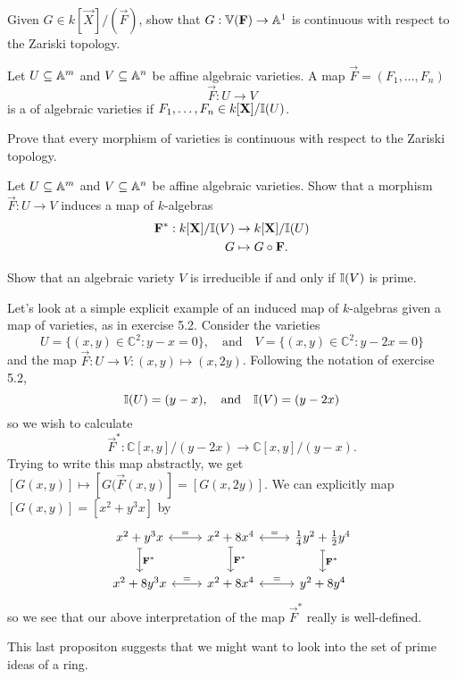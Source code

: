 \documentclass{ximera}
\begin{document}
\begin{exercise}
  Given $G\in k[\vec{X}]/(\vec{F})$, show that $G: \mathbb V(\mathbf{F})\to
  \mathbb A^1$ is continuous with respect to the Zariski topology.
\end{exercise}



\begin{definition}
  Let $U\subseteq\mathbb A^m$ and $V\subseteq\mathbb A^n$ be affine algebraic
  varieties. A map $\vec{F} = (F_1,\dots,F_n)$
  \[
  \vec{F}: U\to V
  \]
  is a  of algebraic varieties if $F_1,\dots,F_n\in k[\mathbf X]/\mathbb I(U)$.
\end{definition}

\begin{exercise}
  Prove that every morphism of varieties is continuous with respect to
  the Zariski topology.
\end{exercise}

\begin{exercise}
   Let $U\subseteq\mathbb A^m$ and $V\subseteq\mathbb A^n$ be affine algebraic varieties. Show that a
   morphism $\vec{F}: U\to V$ induces a map of $k$-algebras
   \begin{align*}
     \mathbf{F}^*:  k[\mathbf X]/\mathbb I(V) &\to k[\mathbf X]/\mathbb I(U)\\
     G &\mapsto G\circ \mathbf{F}.
    \end{align*}
\end{exercise}


\begin{proposition}%
  Show that an algebraic variety $V$ is irreducible if and only if
  $\mathbb I(V)$ is prime.
    
\end{proposition}


\begin{example}
	Let's look at a simple explicit example of an induced map of $k$-algebras given a map of varieties, as in exercise 5.2. Consider the varieties
	\[
	U=\{(x,y)\in\mathbb C^2:y-x=0\}, \quad\text{and}\quad
	V=\{(x,y)\in\mathbb C^2:y-2x=0\}
	\]
	and the map $\vec F:U\to V:(x,y)\mapsto(x,2y)$. Following the notation of exercise 5.2,
	\[
	\mathbb I(U)=(y-x), \quad\text{and}\quad
	\mathbb I(V)=(y-2x)
	\]
	so we wish to calculate
	\[
	\vec F^*:\mathbb C[x,y]/(y-2x)\to\mathbb C[x,y]/(y-x).
	\]
	Trying to write this map abstractly, we get $[G(x,y)]\mapsto[G(\vec F(x,y)]=[G(x,2y)]$. We can explicitly map $[G(x,y)]=[x^2+y^3x]$ by
	\begin{equation*}
	\begin{tikzcd}
	x^2+y^3x \arrow[leftrightarrow]{r}{=}\arrow[mapsto]{d}{\vec F^*} & x^2+8x^4 \arrow[leftrightarrow]{r}{=}\arrow[mapsto]{d}{\vec F^*} & \tfrac14y^2+\tfrac12y^4 \arrow[mapsto]{d}{\vec F^*}\\
	x^2+8y^3x \arrow[leftrightarrow]{r}{=} & x^2+8x^4 \arrow[leftrightarrow]{r}{=} & y^2+8y^4
	\end{tikzcd}
	\end{equation*}
	so we see that our above interpretation of the map $\vec F^*$ really is well-defined.
\end{example}


This last propositon suggests that we might want to look into the set
of prime ideas of a ring.
\end{document}
